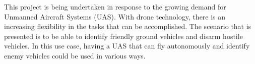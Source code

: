 This project is being undertaken in response to the growing demand for Unmanned Aircraft Systems (UAS). With drone technology, there is an increasing flexibility in the tasks that can be accomplished. The scenario that is presented is to be able to identify friendly ground vehicles and disarm hostile vehicles. In this use case, having a UAS that can fly autonomously and identify enemy vehicles could be used in various ways.